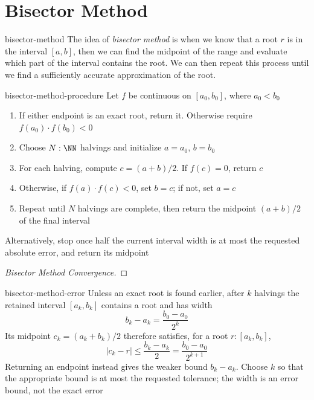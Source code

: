 \documentclass[12pt]{article}
\numberwithin{figure}{section}
\begin{document}
\section{Bisector Method}

\begin{dfn}{bisector-method}
  The idea of \emph{bisector method} is when we know that a root $r$ is in the interval $[a, b]$, then we can find the midpoint of the range and evaluate which part of the interval contains the root. We can then repeat this process until we find a sufficiently accurate approximation of the root. 
\end{dfn} 

\begin{conv}{bisector-method-procedure}
  Let $f$ be continuous on $[a_0,b_0]$, where $a_0<b_0$
  \begin{enumerate}[nosep]
    \item If either endpoint is an exact root, return it. Otherwise require
      $f(a_0)\cdot f(b_0)<0$
    \item Choose $N:\NN$ halvings and initialize $a=a_0$, $b=b_0$
    \item For each halving, compute $c=(a+b)/2$. If $f(c)=0$, return $c$
    \item Otherwise, if $f(a)\cdot f(c)<0$, set $b=c$; if not, set $a=c$
    \item Repeat until $N$ halvings are complete, then return the midpoint
      $(a+b)/2$ of the final interval
  \end{enumerate}
  Alternatively, stop once half the current interval width is at most the
  requested absolute error, and return its midpoint
\end{conv}

\begin{proof}[Bisector Method Convergence]

\end{proof}

\begin{rem}{bisector-method-error}
  Unless an exact root is found earlier, after $k$ halvings the retained
  interval $[a_k,b_k]$ contains a root and has width
  \[
    b_k-a_k=\frac{b_0-a_0}{2^k}
  \]
  Its midpoint $c_k=(a_k+b_k)/2$ therefore satisfies, for a root
  $r:[a_k,b_k]$,
  \[
    |c_k-r|\leq\frac{b_k-a_k}{2}
      =\frac{b_0-a_0}{2^{k+1}}
  \]
  Returning an endpoint instead gives the weaker bound $b_k-a_k$.
  Choose $k$ so that the appropriate bound is at most the requested
  tolerance; the width is an error bound, not the exact error
\end{rem} 
\end{document}
